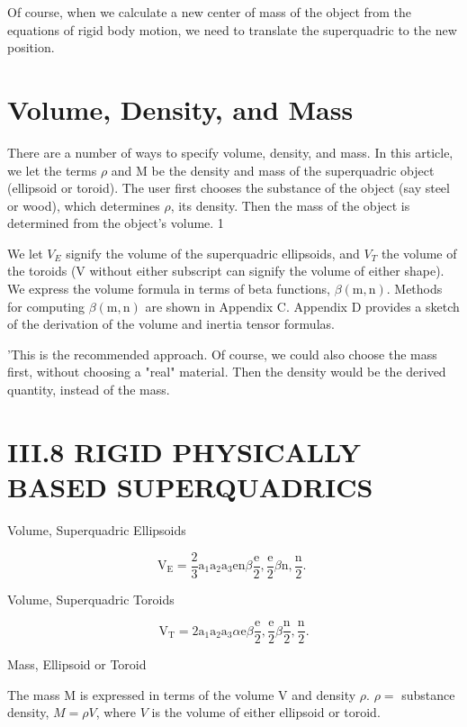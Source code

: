 Of course, when we calculate a new center of mass of the object from the equations of rigid body motion, we need to translate the superquadric to the new position.

\section{Volume, Density, and Mass}
There are a number of ways to specify volume, density, and mass. In this article, we let the terms $\rho$ and $\mathrm{M}$ be the density and mass of the superquadric object (ellipsoid or toroid). The user first chooses the substance of the object (say steel or wood), which determines $\rho$, its density. Then the mass of the object is determined from the object's volume. 1

We let $V_{E}$ signify the volume of the superquadric ellipsoids, and $V_{T}$ the volume of the toroids (V without either subscript can signify the volume of either shape). We express the volume formula in terms of beta functions, $\beta(\mathrm{m}, \mathrm{n})$. Methods for computing $\beta(\mathrm{m}, \mathrm{n})$ are shown in Appendix C. Appendix D provides a sketch of the derivation of the volume and inertia tensor formulas.

'This is the recommended approach. Of course, we could also choose the mass first, without choosing a "real" material. Then the density would be the derived quantity, instead of the mass.

\section{III.8 RIGID PHYSICALLY BASED SUPERQUADRICS}
Volume, Superquadric Ellipsoids

$$
\mathrm{V}_{\mathrm{E}}=\frac{2}{3} \mathrm{a}_{1} \mathrm{a}_{2} \mathrm{a}_{3} \mathrm{e} \mathrm{n} \beta \frac{\mathrm{e}}{2}, \frac{\mathrm{e}}{2} \beta \mathrm{n}, \frac{\mathrm{n}}{2} \text {. }
$$

Volume, Superquadric Toroids

$$
\mathrm{V}_{\mathrm{T}}=2 \mathrm{a}_{1} \mathrm{a}_{2} \mathrm{a}_{3} \alpha \mathrm{e} \beta \frac{\mathrm{e}}{2}, \frac{\mathrm{e}}{2} \beta \frac{\mathrm{n}}{2}, \frac{\mathrm{n}}{2} .
$$

Mass, Ellipsoid or Toroid

The mass $\mathrm{M}$ is expressed in terms of the volume $\mathrm{V}$ and density $\rho$. $\rho=$ substance density, $M=\rho V$, where $V$ is the volume of either ellipsoid or toroid.

